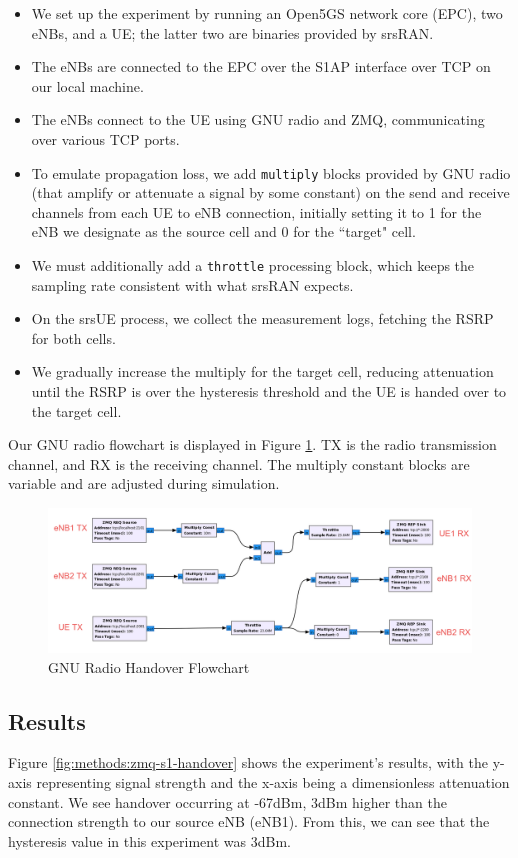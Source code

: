 \begin{itemize}
    \item We set up the experiment by running an Open5GS network core (EPC), two eNBs, and a UE; the latter two are binaries provided by srsRAN.
    \item The eNBs are connected to the EPC over the S1AP interface over TCP on our local machine.
    \item The eNBs connect to the UE using GNU radio and ZMQ, communicating over various TCP ports.
    \item To emulate propagation loss, we add \texttt{multiply} blocks provided by GNU radio (that amplify or attenuate a signal by some constant) on the send and receive channels from each UE to eNB connection, initially setting it to 1 for the eNB we designate as the source cell and 0 for the ``target" cell. 
    \item We must additionally add a \texttt{throttle} processing block, which keeps the sampling rate consistent with what srsRAN expects.
    \item On the srsUE process, we collect the measurement logs, fetching the RSRP for both cells.
    \item We gradually increase the multiply for the target cell, reducing attenuation until the RSRP is over the hysteresis threshold and the UE is handed over to the target cell.
\end{itemize}

Our GNU radio flowchart is displayed in Figure \ref{fig:gnuradio}. TX is the radio transmission channel, and RX is the receiving channel. The multiply constant blocks are variable and are adjusted during simulation.
\begin{figure}[h]
    \centering
    \includegraphics[width=1\linewidth]{src//img/flowchart.png}
    \caption{GNU Radio Handover Flowchart}
    \label{fig:gnuradio}
\end{figure}

\subsection{Results}
Figure \ref{fig:methods:zmq-s1-handover} shows the experiment's results, with the y-axis representing signal strength and the x-axis being a dimensionless attenuation constant. We see handover occurring at -67dBm, 3dBm higher than the connection strength to our source eNB (eNB1). From this, we can see that the hysteresis value in this experiment was 3dBm. 

